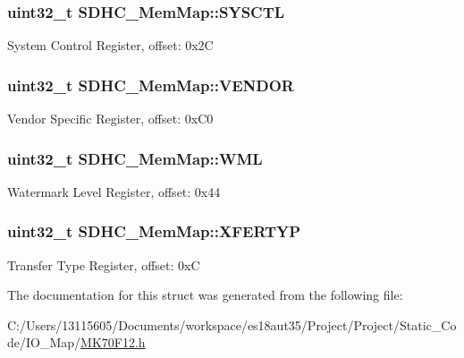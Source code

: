 \subsubsection[{S\+Y\+S\+C\+T\+L}]{\setlength{\rightskip}{0pt plus 5cm}uint32\+\_\+t S\+D\+H\+C\+\_\+\+Mem\+Map\+::\+S\+Y\+S\+C\+T\+L}\label{struct_s_d_h_c___mem_map_ae3204e728de4488f0b3569d1ebac78ae}
System Control Register, offset\+: 0x2\+C \hypertarget{struct_s_d_h_c___mem_map_ac3938ee338b7499c8b1cebed71604299}{}
\subsubsection[{V\+E\+N\+D\+O\+R}]{\setlength{\rightskip}{0pt plus 5cm}uint32\+\_\+t S\+D\+H\+C\+\_\+\+Mem\+Map\+::\+V\+E\+N\+D\+O\+R}\label{struct_s_d_h_c___mem_map_ac3938ee338b7499c8b1cebed71604299}
Vendor Specific Register, offset\+: 0x\+C0 \hypertarget{struct_s_d_h_c___mem_map_a8c1eb45065f5eb8878fc02701f2a6750}{}
\subsubsection[{W\+M\+L}]{\setlength{\rightskip}{0pt plus 5cm}uint32\+\_\+t S\+D\+H\+C\+\_\+\+Mem\+Map\+::\+W\+M\+L}\label{struct_s_d_h_c___mem_map_a8c1eb45065f5eb8878fc02701f2a6750}
Watermark Level Register, offset\+: 0x44 \hypertarget{struct_s_d_h_c___mem_map_ad6c008e044af83f7411e51258f111c48}{}
\subsubsection[{X\+F\+E\+R\+T\+Y\+P}]{\setlength{\rightskip}{0pt plus 5cm}uint32\+\_\+t S\+D\+H\+C\+\_\+\+Mem\+Map\+::\+X\+F\+E\+R\+T\+Y\+P}\label{struct_s_d_h_c___mem_map_ad6c008e044af83f7411e51258f111c48}
Transfer Type Register, offset\+: 0x\+C 

The documentation for this struct was generated from the following file\+:\begin{DoxyCompactItemize}
\item 
C\+:/\+Users/13115605/\+Documents/workspace/es18aut35/\+Project/\+Project/\+Static\+\_\+\+Code/\+I\+O\+\_\+\+Map/\hyperlink{_m_k70_f12_8h}{M\+K70\+F12.\+h}\end{DoxyCompactItemize}
